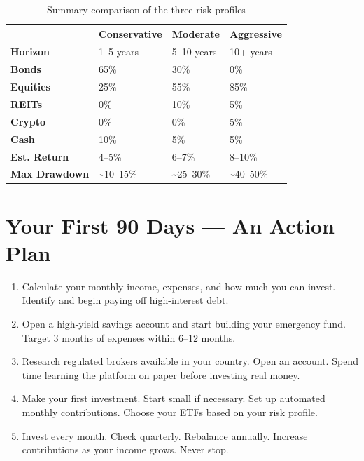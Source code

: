 \documentclass[12pt, a4paper]{book}
\begin{document}
\begin{table}[h!]
\centering
\renewcommand{\arraystretch}{1.4}
\begin{tabular}{>{\bfseries}p{2.5cm}p{2.5cm}p{2.5cm}p{2.5cm}}
\toprule
 & \textbf{Conservative} & \textbf{Moderate} & \textbf{Aggressive} \\
\midrule
Horizon & 1--5 years & 5--10 years & 10+ years \\
Bonds & 65\% & 30\% & 0\% \\
Equities & 25\% & 55\% & 85\% \\
REITs & 0\% & 10\% & 5\% \\
Crypto & 0\% & 0\% & 5\% \\
Cash & 10\% & 5\% & 5\% \\
Est. Return & 4--5\% & 6--7\% & 8--10\% \\
Max Drawdown & \textasciitilde{}10--15\% & \textasciitilde{}25--30\% & \textasciitilde{}40--50\% \\
\bottomrule
\end{tabular}
\caption{Summary comparison of the three risk profiles}
\end{table}

\section{Your First 90 Days --- An Action Plan}

\begin{enumerate}[leftmargin=1.5cm]
  \item[\textbf{Week 1--2:}] Calculate your monthly income, expenses, and how much you can invest. Identify and begin paying off high-interest debt.
  \item[\textbf{Week 3--4:}] Open a high-yield savings account and start building your emergency fund. Target 3 months of expenses within 6--12 months.
  \item[\textbf{Month 2:}] Research regulated brokers available in your country. Open an account. Spend time learning the platform on paper before investing real money.
  \item[\textbf{Month 3:}] Make your first investment. Start small if necessary. Set up automated monthly contributions. Choose your ETFs based on your risk profile.
  \item[\textbf{Ongoing:}] Invest every month. Check quarterly. Rebalance annually. Increase contributions as your income grows. Never stop.
\end{enumerate}
\end{document}
